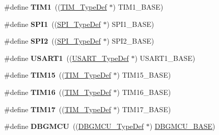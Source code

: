 \begin{DoxyCompactItemize}
\#define {\bfseries T\+I\+M1}~((\hyperlink{struct_t_i_m___type_def}{T\+I\+M\+\_\+\+Type\+Def} $\ast$) T\+I\+M1\+\_\+\+B\+A\+SE)
\item 
\mbox{\label{group___peripheral__declaration_gad483be344a28ac800be8f03654a9612f}} 
\#define {\bfseries S\+P\+I1}~((\hyperlink{struct_s_p_i___type_def}{S\+P\+I\+\_\+\+Type\+Def} $\ast$) S\+P\+I1\+\_\+\+B\+A\+SE)
\item 
\mbox{\label{group___peripheral__declaration_gaf2c3d8ce359dcfbb2261e07ed42af72b}} 
\#define {\bfseries S\+P\+I2}~((\hyperlink{struct_s_p_i___type_def}{S\+P\+I\+\_\+\+Type\+Def} $\ast$) S\+P\+I2\+\_\+\+B\+A\+SE)
\item 
\mbox{\label{group___peripheral__declaration_ga92871691058ff7ccffd7635930cb08da}} 
\#define {\bfseries U\+S\+A\+R\+T1}~((\hyperlink{struct_u_s_a_r_t___type_def}{U\+S\+A\+R\+T\+\_\+\+Type\+Def} $\ast$) U\+S\+A\+R\+T1\+\_\+\+B\+A\+SE)
\item 
\mbox{\label{group___peripheral__declaration_ga87e4b442041d1c03a6af113fbe04a182}} 
\#define {\bfseries T\+I\+M15}~((\hyperlink{struct_t_i_m___type_def}{T\+I\+M\+\_\+\+Type\+Def} $\ast$) T\+I\+M15\+\_\+\+B\+A\+SE)
\item 
\mbox{\label{group___peripheral__declaration_ga73ec606e7dacf17e18c661e8ff8c7c8d}} 
\#define {\bfseries T\+I\+M16}~((\hyperlink{struct_t_i_m___type_def}{T\+I\+M\+\_\+\+Type\+Def} $\ast$) T\+I\+M16\+\_\+\+B\+A\+SE)
\item 
\mbox{\label{group___peripheral__declaration_ga65aea6c8b36439e44ad6cde0e6891aab}} 
\#define {\bfseries T\+I\+M17}~((\hyperlink{struct_t_i_m___type_def}{T\+I\+M\+\_\+\+Type\+Def} $\ast$) T\+I\+M17\+\_\+\+B\+A\+SE)
\item 
\mbox{\label{group___peripheral__declaration_ga92ec6d9ec2251fda7d4ce09748cd74b4}} 
\#define {\bfseries D\+B\+G\+M\+CU}~((\hyperlink{struct_d_b_g_m_c_u___type_def}{D\+B\+G\+M\+C\+U\+\_\+\+Type\+Def} $\ast$) \hyperlink{group___peripheral__memory__map_ga4adaf4fd82ccc3a538f1f27a70cdbbef}{D\+B\+G\+M\+C\+U\+\_\+\+B\+A\+SE})

\end{DoxyCompactItemize}
